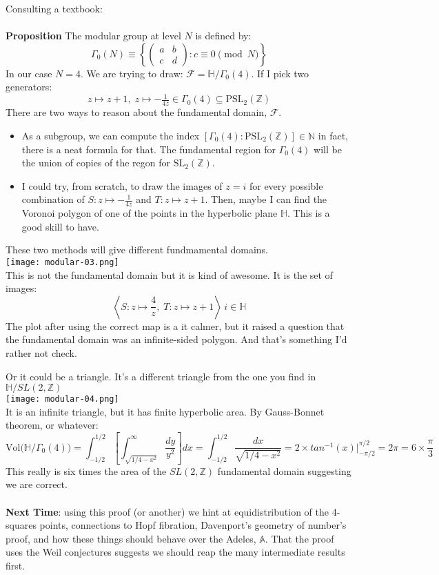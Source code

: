 \documentclass[12pt]{article}
\begin{document}
\noindent Consulting a textbook: \\ \\
\textbf{Proposition} The modular group at level $N$ is defined by:
$$ \Gamma_0(N) \equiv \left\{  \left( \begin{array}{cc}
a & b \\ c & d \end{array} \right) : c \equiv 0 \pmod N \right\}  $$
In our case $N = 4$.  We are trying to draw: $\mathcal{F} = \mathbb{H}/\Gamma_0(4)$.  If I pick two generators:
$$ z \mapsto z + 1,\; z \mapsto - \tfrac{1}{4z} \in \Gamma_0(4) \subseteq \text{PSL}_2(\mathbb{Z}) $$
There are two ways to reason about the fundamental domain, $\mathcal{F}$.
\begin{itemize}
\item As a subgroup, we can compute the index $[\Gamma_0(4):\text{PSL}_2(\mathbb{Z})] \in \mathbb{N}$ in fact, there is a neat formula for that.  The fundamental region for $\Gamma_0(4)$ will be the union of copies of the regon for $\text{SL}_2(\mathbb{Z})$.
\item I could try, from scratch, to draw the images of $z=i$ for every possible combination of $S: z \mapsto - \frac{1}{4z}$ and $T: z \mapsto z+1$.  Then, maybe I can find the Voronoi polygon of one of the points in the hyperbolic plane $\mathbb{H}$.  This is a good skill to have.
\end{itemize} 
These two methods will give different fundmamental domains.\\
\texttt{[image: modular-03.png]} \\ 
This is not the fundamental domain but it is kind of awesome.  It is the set of images:
$$ \left\langle S:z \mapsto \frac{4}{z} ,\;  T:z \mapsto z + 1\right\rangle \, i \in \mathbb{H} $$
The plot after using the correct map is a it calmer, but it raised a question that the fundamental domain was an infinite-sided polygon.  And that's something I'd rather not check.

\newpage

\noindent Or it could be a triangle.  It's a different triangle from the one you find in $\mathbb{H}/SL(2, \mathbb{Z})$ \\
\texttt{[image: modular-04.png]} \\ 
It is an infinite triangle, but it has finite hyperbolic area.  By Gauss-Bonnet theorem, or whatever:
$$ \text{Vol}\big(\mathbb{H}/\Gamma_0(4)\big) = \int_{-1/2}^{1/2} \left[ \int^\infty_{\sqrt{1/4-x^2}} \frac{dy}{y^2} \right]dx =  \int_{-1/2}^{1/2}  \frac{dx}{\sqrt{1/4 - x^2}}
= 2 \times tan^{-1}(x)\bigg|_{-\pi/2}^{\pi/2} = 2\pi = 6 \times \frac{\pi}{3}$$
This really is six times the area of the $SL(2, \mathbb{Z})$ fundamental domain suggesting we are correct.  \\ \\
\textbf{Next Time}: using this proof (or another) we hint at equidistribution of the 4-squares points, connections to Hopf fibration, Davenport's geometry of number's proof, and how these things should behave over the Adeles, $\mathbb{A}$.  That the proof uses the Weil conjectures suggests we should reap the many intermediate results first.
\end{document}
